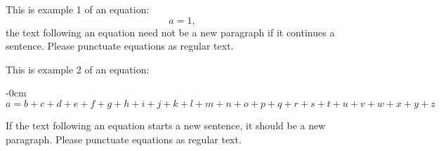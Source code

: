 \documentclass[geomatics,article,submit,moreauthors]{Definitions/mdpi}
\begin{document}
This is example 1 of an equation:
\begin{equation}
a = 1,
\end{equation}
the text following an equation need not be a new paragraph if it continues a sentence. Please punctuate equations as regular text.

This is example 2 of an equation:
\begin{adjustwidth}{-\extralength}{0cm}
\begin{equation}
a = b + c + d + e + f + g + h + i + j + k + l + m + n + o + p + q + r + s + t + u + v + w + x + y + z
\end{equation}
\end{adjustwidth}

If the text following an equation starts a new sentence, it should be a new paragraph. Please punctuate equations as regular text.

\end{document}
